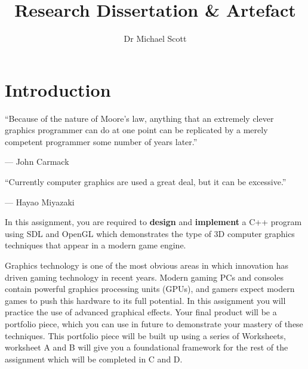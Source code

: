 \documentclass{../fal_assignment}
\title{Research Dissertation \& Artefact}
\author{Dr Michael Scott}
\begin{document}
\maketitle

\section*{Introduction}

\begin{marginquote}
``Because of the nature of Moore's law, anything that an extremely clever graphics programmer can do at one point can be replicated by a merely competent programmer some number of years later.''

--- John Carmack

    \marginquoterule

``Currently computer graphics are used a great deal, but it can be excessive.''

--- Hayao Miyazaki
\end{marginquote}

In this assignment, you are required to \textbf{design} and \textbf{implement} a C++ program using SDL and OpenGL
which demonstrates the type of 3D computer graphics techniques that appear in a modern game engine.

Graphics technology is one of the most obvious areas in which innovation has driven gaming technology in recent years.
Modern gaming PCs and consoles contain powerful graphics processing units (GPUs),
and gamers expect modern games to push this hardware to its full potential.
In this assignment you will practice the use of advanced graphical effects.
Your final product will be a portfolio piece, which you can use in future to demonstrate your mastery of these techniques. This portfolio piece will be built up using a series of Worksheets, worksheet A and B will give you a foundational framework for
the rest of the assignment which will be completed in C and D.
\end{document}
